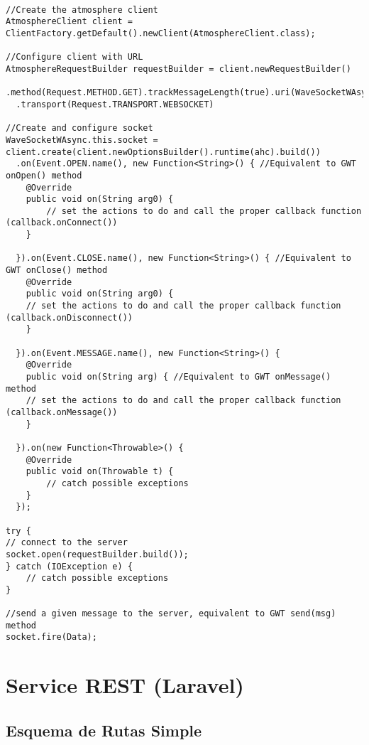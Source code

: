 	  \begin{lstlisting}[frame=single]	  	  
	  
//Create the atmosphere client
AtmosphereClient client = ClientFactory.getDefault().newClient(AtmosphereClient.class);

//Configure client with URL
AtmosphereRequestBuilder requestBuilder = client.newRequestBuilder()
  .method(Request.METHOD.GET).trackMessageLength(true).uri(WaveSocketWAsync.this.urlBase)
  .transport(Request.TRANSPORT.WEBSOCKET)
  
//Create and configure socket
WaveSocketWAsync.this.socket = client.create(client.newOptionsBuilder().runtime(ahc).build())
  .on(Event.OPEN.name(), new Function<String>() { //Equivalent to GWT onOpen() method
    @Override
    public void on(String arg0) {
		// set the actions to do and call the proper callback function (callback.onConnect())
    }
    
  }).on(Event.CLOSE.name(), new Function<String>() { //Equivalent to GWT onClose() method
    @Override
    public void on(String arg0) {
    // set the actions to do and call the proper callback function (callback.onDisconnect())
    }
    
  }).on(Event.MESSAGE.name(), new Function<String>() {
    @Override
    public void on(String arg) { //Equivalent to GWT onMessage() method
    // set the actions to do and call the proper callback function (callback.onMessage())
    }
    
  }).on(new Function<Throwable>() {
    @Override
    public void on(Throwable t) {
		// catch possible exceptions
    }
  });
          
try {
// connect to the server
socket.open(requestBuilder.build());
} catch (IOException e) {
	// catch possible exceptions
}
      
//send a given message to the server, equivalent to GWT send(msg) method 
socket.fire(Data);
	\end{lstlisting}
	  
\section{Service REST (Laravel)}

\subsection{Esquema de Rutas Simple}\label{ssec:codeRoutesSimple}

